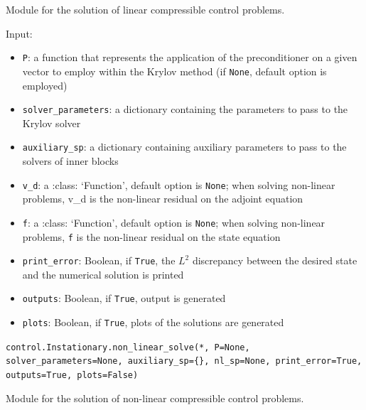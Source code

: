 \documentclass[letterpaper,10pt,english]{sphinxmanual}
\begin{document}
Module for the solution of linear compressible control problems.

Input:
\begin{itemize}
\item \texttt{P}: a function that represents the application of the
            preconditioner on a given vector to employ within the Krylov
            method (if \texttt{None}, default option is employed)

\item \texttt{solver{\_}parameters}: a dictionary containing the parameters to pass
            to the Krylov solver

\item \texttt{auxiliary{\_}sp}: a dictionary containing auxiliary parameters to
            pass to the solvers of inner blocks

\item \texttt{v{\_}d}: a :class: `Function', default option is \texttt{None}; when solving
            non-linear problems, v\_d is the non-linear residual on the adjoint
            equation

\item \texttt{f}:  a :class: `Function', default option is \texttt{None}; when solving
            non-linear problems, \texttt{f} is the non-linear residual on the state
            equation

\item \texttt{print{\_}error}: Boolean, if \texttt{True}, the $L^2$ discrepancy between the desired state and the numerical solution is printed

\item \texttt{outputs}: Boolean, if \texttt{True}, output is generated

\item \texttt{plots}: Boolean, if \texttt{True}, plots of the solutions are generated
\end{itemize}

\vspace{3ex}

\texttt{control.Instationary.non{\_}linear{\_}solve(*, P=None, solver{\_}parameters=None, auxiliary{\_}sp=\{\}, nl{\_}sp=None, print{\_}error=True, outputs=True, plots=False)}

Module for the solution of non-linear compressible control problems.
\end{document}
